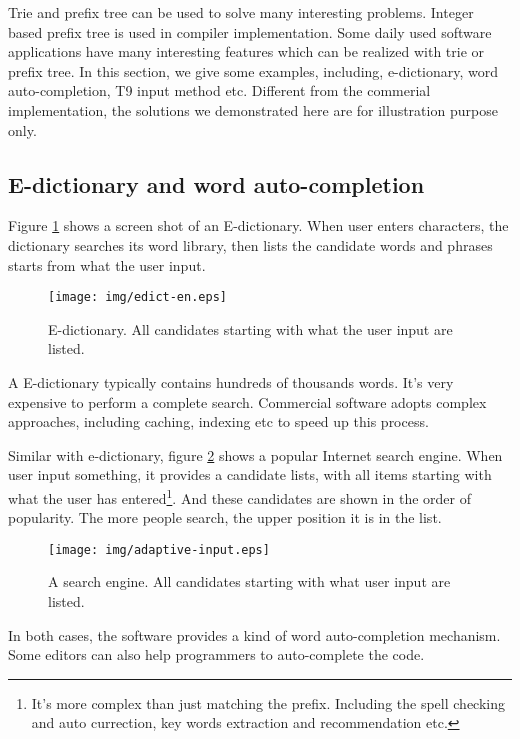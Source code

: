 \documentclass[b5paper]{article}
\begin{document}
Trie and prefix tree can be used to solve many interesting problems.
Integer based prefix tree is used in compiler implementation. Some daily
used software applications have many interesting features which can be
realized with trie or prefix tree. In this section, we give some examples,
including, e-dictionary, word auto-completion, T9
input method etc. Different from the commerial implementation, the
solutions we demonstrated here are for illustration purpose
only.

\subsection{E-dictionary and word auto-completion}
Figure \ref{fig:e-dict} shows a screen shot of an E-dictionary.
When user enters characters,
the dictionary searches its word library, then lists the candidate words and
phrases starts from what the user input.

\begin{figure}[htbp]
  \centering
  \texttt{[image: img/edict-en.eps]}
  \caption{E-dictionary. All candidates starting with what the user input are listed.}
  \label{fig:e-dict}
\end{figure}

A E-dictionary typically contains hundreds of thousands words. It's very expensive
to perform a complete search. Commercial software adopts complex approaches, including
caching, indexing etc to speed up this process.

Similar with e-dictionary, figure \ref{fig:word-completion} shows a popular
Internet search engine. When user input something, it provides a candidate
lists, with all items starting with what the user has entered\footnote{It's more complex than just matching the prefix. Including the spell checking and auto currection, key words extraction and recommendation etc.}. And these candidates
are shown in the order of popularity. The more people search, the
upper position it is in the list.

\begin{figure}[htbp]
  \centering
  \texttt{[image: img/adaptive-input.eps]}
  \caption{A search engine. All candidates starting with what user input are listed.}
  \label{fig:word-completion}
\end{figure}

In both cases, the software provides a kind of word auto-completion mechanism.
Some editors can also help programmers to auto-complete the code.
\end{document}
